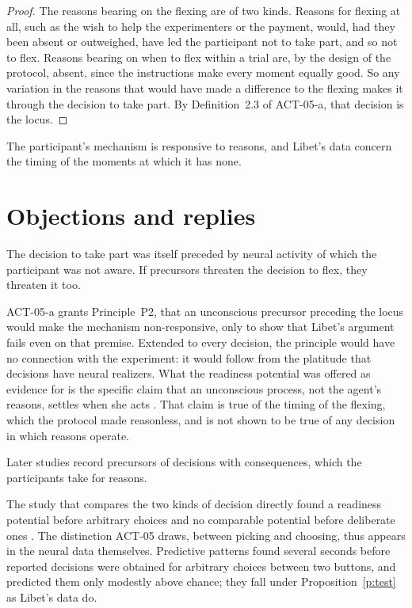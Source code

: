 \documentclass{situationist-preprint}
\begin{document}
\begin{proof}
The reasons bearing on the flexing are of two kinds. Reasons for flexing at all, such as the wish to help the experimenters or the payment, would, had they been absent or outweighed, have led the participant not to take part, and so not to flex. Reasons bearing on when to flex within a trial are, by the design of the protocol, absent, since the instructions make every moment equally good. So any variation in the reasons that would have made a difference to the flexing makes it through the decision to take part. By Definition~2.3 of ACT-05-a, that decision is the locus.
\end{proof}

The participant's mechanism is responsive to reasons, and Libet's data concern the timing of the moments at which it has none.

\section{Objections and replies}

\begin{objection}
The decision to take part was itself preceded by neural activity of which the participant was not aware. If precursors threaten the decision to flex, they threaten it too.
\end{objection}

\begin{reply}
ACT-05-a grants Principle~P2, that an unconscious precursor preceding the locus would make the mechanism non-responsive, only to show that Libet's argument fails even on that premise. Extended to every decision, the principle would have no connection with the experiment: it would follow from the platitude that decisions have neural realizers. What the readiness potential was offered as evidence for is the specific claim that an unconscious process, not the agent's reasons, settles when she acts \citep{Libet1985}. That claim is true of the timing of the flexing, which the protocol made reasonless, and is not shown to be true of any decision in which reasons operate.
\end{reply}

\begin{objection}
Later studies record precursors of decisions with consequences, which the participants take for reasons.
\end{objection}

\begin{reply}
The study that compares the two kinds of decision directly found a readiness potential before arbitrary choices and no comparable potential before deliberate ones \citep{Maoz2019}. The distinction ACT-05 draws, between picking and choosing, thus appears in the neural data themselves. Predictive patterns found several seconds before reported decisions \citep{Soon2008} were obtained for arbitrary choices between two buttons, and predicted them only modestly above chance; they fall under Proposition~\ref{p:test} as Libet's data do.
\end{reply}
\end{document}
